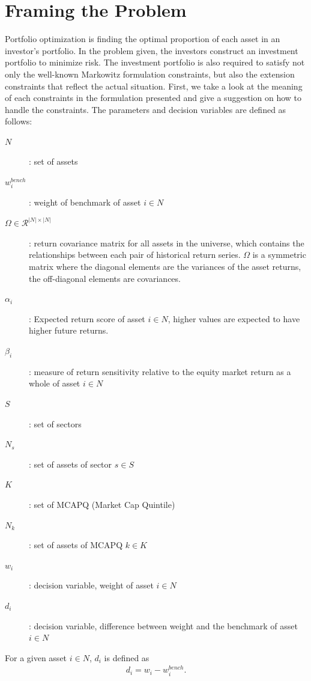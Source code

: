 \documentclass[11pt]{article}
\begin{document}
	\section*{Framing the Problem}
	Portfolio optimization is finding the optimal proportion of each asset in an investor’s portfolio. In the problem given, the investors construct an investment portfolio to minimize risk. The investment portfolio is also required to satisfy not only the well-known Markowitz formulation constraints, but also the extension constraints that reflect the actual situation. First, we take a look at the meaning of each constraints in the formulation presented and give a suggestion on how to handle the constraints.
	The parameters and decision variables are defined as follows:
	\begin{description}
		\item[$N$]: set of assets
		\item[$w^{bench}_i$]: weight of benchmark of asset $i \in N$
		\item[$\Omega \in \mathcal{R}^{|N|\times |N|}$]: return covariance matrix for all assets in the universe, which contains the relationships between each pair of historical return series. $\Omega$ is a symmetric matrix where the diagonal elements are the variances of the asset returns, the off-diagonal elements are covariances.
		\item[$\alpha_i$]: Expected return score of asset $i \in N$, higher values are expected to have higher future returns.
		\item[$\beta_i$]: measure of return sensitivity relative to the equity market return as a whole of asset $i \in N$ 
		\item[$S$]: set of sectors
		\item[$N_s$]: set of assets of sector $s \in S$
		\item[$K$]: set of MCAPQ (Market Cap Quintile)
		\item[$N_k$]: set of assets of MCAPQ $k \in K$
		\item[$w_i$]: decision variable, weight of asset $i \in N$
		\item[$d_i$]: decision variable, difference between weight and the benchmark of asset $i \in N$
	\end{description}
	
	
	For a given asset $i \in N$, $d_i$ is defined as
	\begin{align}
	d_i = w_i - w^{bench}_i. \label{eq:P:activeweight}
	\end{align}
	
\end{document}
